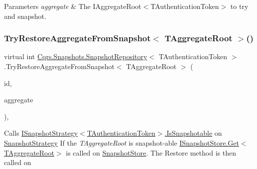 \begin{DoxyParams}{Parameters}
{\em aggregate} & The I\+Aggregate\+Root$<$\+T\+Authentication\+Token$>$ to try and snapshot.\\
\hline
\end{DoxyParams}
\mbox{\label{classCqrs_1_1Snapshots_1_1SnapshotRepository_a1328c103474b2b394b7af61a24455a65_a1328c103474b2b394b7af61a24455a65}} 
\subsubsection{\texorpdfstring{Try\+Restore\+Aggregate\+From\+Snapshot$<$ T\+Aggregate\+Root $>$()}{TryRestoreAggregateFromSnapshot< TAggregateRoot >()}}
{\footnotesize\ttfamily virtual int \hyperlink{classCqrs_1_1Snapshots_1_1SnapshotRepository}{Cqrs.\+Snapshots.\+Snapshot\+Repository}$<$ T\+Authentication\+Token $>$.Try\+Restore\+Aggregate\+From\+Snapshot$<$ T\+Aggregate\+Root $>$ (\begin{DoxyParamCaption}\item[{Guid}]{id,  }\item[{T\+Aggregate\+Root}]{aggregate }\end{DoxyParamCaption})\hspace{0.3cm}{\ttfamily [protected]}, {\ttfamily [virtual]}}



Calls \hyperlink{interfaceCqrs_1_1Snapshots_1_1ISnapshotStrategy_a02121821312c4ce2811b31eeaffabe51_a02121821312c4ce2811b31eeaffabe51}{I\+Snapshot\+Strategy$<$\+T\+Authentication\+Token$>$.\+Is\+Snapshotable} on \hyperlink{classCqrs_1_1Snapshots_1_1SnapshotRepository_a7d65b4df10d0b6f75c911a9b6d59b3ba_a7d65b4df10d0b6f75c911a9b6d59b3ba}{Snapshot\+Strategy} If the {\itshape T\+Aggregate\+Root}  is snapshot-\/able \hyperlink{interfaceCqrs_1_1Snapshots_1_1ISnapshotStore_ab7bd163fc9cd5c3bd5911679030be403_ab7bd163fc9cd5c3bd5911679030be403}{I\+Snapshot\+Store.\+Get$<$\+T\+Aggregate\+Root$>$} is called on \hyperlink{classCqrs_1_1Snapshots_1_1SnapshotRepository_aba01e9f20eb41e6f3e4476a7f3182275_aba01e9f20eb41e6f3e4476a7f3182275}{Snapshot\+Store}. The Restore method is then called on 


